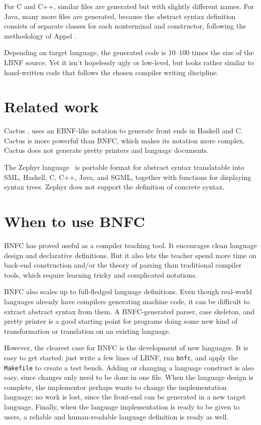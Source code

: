 \documentclass{sig-alt}
\begin{document}
For C and C++, similar files are generated but with slightly different
names. For Java, many more files are generated, because the abstract
syntax definition consists of separate classes for each nonterminal
and constructor, following the methodology of Appel 
\cite{AppelJ}.

Depending on target language, the generated code is 10--100 times the
size of the LBNF source. Yet it isn't hopelessly ugly or low-level,
but looks rather similar to hand-written code that follows the
chosen compiler writing discipline.

\section{Related work}

Cactus \cite{Cactus},
uses an EBNF-like notation to 
generate front ends in Haskell and C.
Cactus is more powerful than BNFC, which makes its notation
more complex. Cactus does not generate pretty printers and
language documents.

The Zephyr language 
\cite{zephyr}\ is portable format for abstract syntax
translatable into SML, Haskell, C, C++,
Java, and SGML, together with functions for displaying syntax trees. 
Zephyr does not support the definition of concrete syntax. 


\section{When to use BNFC}

BNFC has proved useful as a compiler teaching tool. It encourages
clean language design and declarative definitions. But it also lets the
teacher spend more time on back-end construction and/or the theory
of parsing than traditional compiler tools, which require learning
tricky and complicated notations.

BNFC also scales up to full-fledged language definitions.
Even though real-world languages already have compilers
generating machine code, it can be difficult to extract abstract
syntax from them.
A BNFC-generated parser, case skeleton, and
pretty printer is a good starting point for programs doing
some new kind of transformation or translation on an existing
language.

However, the clearest case for BNFC is the development of new languages.
It is easy to get started: just write a few lines of LBNF,
run \texttt{bnfc}, and apply the \texttt{Makefile} to create a
test bench. 
Adding or changing a language construct is also easy, since changes
only need to be done in one file. 
When the language design is complete, the implementor perhaps wants
to change the implementation language; no work is lost, since the
front-end can be generated in a new target language,
Finally, when the language implementation is ready to be given to
users, a reliable and human-readable language definition is ready as well.
\end{document}
